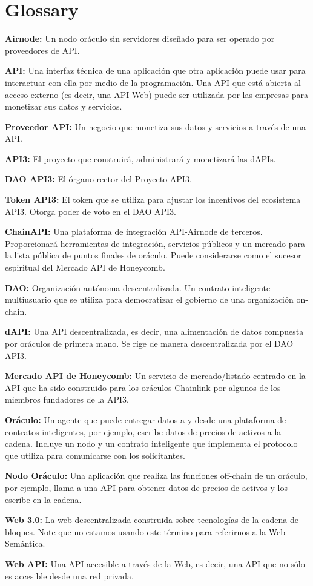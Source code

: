 \documentclass[11pt]{article}
\begin{document}
\small



\newpage
\normalsize
\appendix
\section{Glossary}

\textbf{Airnode:} Un nodo oráculo sin servidores diseñado para ser operado por proveedores de API.

\textbf{API:} Una interfaz técnica de una aplicación que otra aplicación puede usar para interactuar con ella por medio de la programación. Una API que está abierta al acceso externo (es decir, una API Web) puede ser utilizada por las empresas para monetizar sus datos y servicios.

\textbf{Proveedor API:} Un negocio que monetiza sus datos y servicios a través de una API.

\textbf{API3:} El proyecto que construirá, administrará y monetizará las dAPIs.

\textbf{DAO API3:} El órgano rector del Proyecto API3.

\textbf{Token API3:} El token que se utiliza para ajustar los incentivos del ecosistema API3. Otorga poder de voto en el DAO API3.

\textbf{ChainAPI:} Una plataforma de integración API-Airnode de terceros. Proporcionará herramientas de integración, servicios públicos y un mercado para la lista pública de puntos finales de oráculo. Puede considerarse como el sucesor espiritual del Mercado API de Honeycomb.

\textbf{DAO:} Organización autónoma descentralizada. Un contrato inteligente multiusuario que se utiliza para democratizar el gobierno de una organización on-chain.

\textbf{dAPI:} Una API descentralizada, es decir, una alimentación de datos compuesta por oráculos de primera mano. Se rige de manera descentralizada por el DAO API3.

\textbf{Mercado API de Honeycomb:} Un servicio de mercado/listado centrado en la API que ha sido construido para los oráculos Chainlink por algunos de los miembros fundadores de la API3.

\textbf{Oráculo:} Un agente que puede entregar datos a y desde una plataforma de contratos inteligentes, por ejemplo, escribe datos de precios de activos a la cadena. Incluye un nodo y un contrato inteligente que implementa el protocolo que utiliza para comunicarse con los solicitantes.

\textbf{Nodo Oráculo:} Una aplicación que realiza las funciones off-chain de un oráculo, por ejemplo, llama a una API para obtener datos de precios de activos y los escribe en la cadena.

\textbf{Web 3.0:} La web descentralizada construida sobre tecnologías de la cadena de bloques. Note que no estamos usando este término para referirnos a la Web Semántica.

\textbf{Web API:} Una API accesible a través de la Web, es decir, una API que no sólo es accesible desde una red privada.
\end{document}
